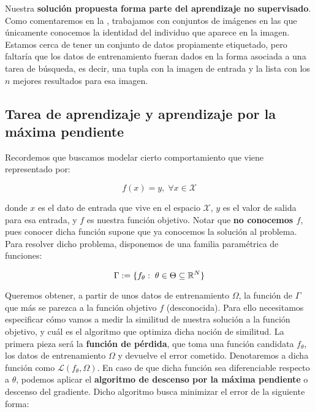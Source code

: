 Nuestra \textbf{solución propuesta forma parte del aprendizaje no supervisado}. Como comentaremos en la , trabajamos con conjuntos de imágenes en las que únicamente conocemos la identidad del individuo que aparece en la imagen. Estamos cerca de tener un conjunto de datos propiamente etiquetado, pero faltaría que los datos de entrenamiento fueran dados en la forma asociada a una tarea de búsqueda, es decir, una tupla con la imagen de entrada y la lista con los $n$ mejores resultados para esa imagen.

\subsection{Tarea de aprendizaje y aprendizaje por la máxima pendiente}

Recordemos que buscamos modelar cierto comportamiento que viene representado por:

\begin{equation}
	f(x) = y, \; \forall x \in \mathcal{X}
\end{equation}

donde $x$ es el dato de entrada que vive en el espacio $\mathcal{X}$, $y$ es el valor de salida para esa entrada, y $f$ es nuestra función objetivo. Notar que \textbf{no conocemos $f$}, pues conocer dicha función supone que ya conocemos la solución al problema. Para resolver dicho problema, disponemos de una familia paramétrica de funciones:

\begin{equation}
	\Gamma := \{ f_{\theta}: \; \theta \in \Theta \subseteq \mathbb{R}^N  \}
\end{equation}

Queremos obtener, a partir de unos datos de entrenamiento $\Omega$, la función de $\Gamma$ que más se parezca a la función objetivo $f$ (desconocida). Para ello necesitamos especificar cómo vamos a medir la similitud de nuestra solución a la función objetivo, y cuál es el algoritmo que optimiza dicha noción de similitud. La primera pieza será la \textbf{función de pérdida}, que toma una función candidata $f_{\theta}$, los datos de entrenamiento $\Omega$ y devuelve el error cometido. Denotaremos a dicha función como $\mathcal{L}(f_\theta, \Omega)$. En caso de que dicha función sea diferenciable respecto a $\theta$, podemos aplicar el \textbf{algoritmo de descenso por la máxima pendiente} o descenso del gradiente. Dicho algoritmo busca minimizar el error de la siguiente forma:

